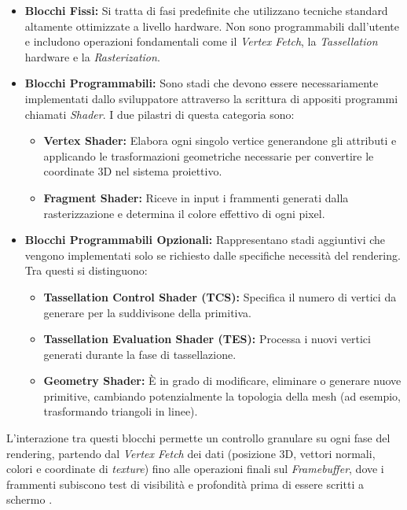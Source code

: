 \begin{itemize}
    \item \textbf{Blocchi Fissi:} Si tratta di fasi predefinite che utilizzano tecniche standard altamente ottimizzate a livello hardware. Non sono programmabili dall'utente e includono operazioni fondamentali come il \textit{Vertex Fetch}, la \textit{Tassellation} hardware e la \textit{Rasterization}.
    
    \item \textbf{Blocchi Programmabili:} Sono stadi che devono essere necessariamente implementati dallo sviluppatore attraverso la scrittura di appositi programmi chiamati \textit{Shader}. I due pilastri di questa categoria sono:
    \begin{itemize}
        \item \textbf{Vertex Shader:} Elabora ogni singolo vertice generandone gli attributi e applicando le trasformazioni geometriche necessarie per convertire le coordinate 3D nel sistema proiettivo.
        \item \textbf{Fragment Shader:} Riceve in input i frammenti generati dalla rasterizzazione e determina il colore effettivo di ogni pixel.
    \end{itemize}
    
    \item \textbf{Blocchi Programmabili Opzionali:} Rappresentano stadi aggiuntivi che vengono implementati solo se richiesto dalle specifiche necessità del rendering. Tra questi si distinguono:
    \begin{itemize}
        \item \textbf{Tassellation Control Shader (TCS):} Specifica il numero di vertici da generare per la suddivisone della primitiva.
        \item \textbf{Tassellation Evaluation Shader (TES):} Processa i nuovi vertici generati durante la fase di tassellazione.
        \item \textbf{Geometry Shader:} È in grado di modificare, eliminare o generare nuove primitive, cambiando potenzialmente la topologia della mesh (ad esempio, trasformando triangoli in linee).
    \end{itemize}
\end{itemize}

L'interazione tra questi blocchi permette un controllo granulare su ogni fase del rendering, partendo dal \textit{Vertex Fetch} dei dati (posizione 3D, vettori normali, colori e coordinate di \textit{texture}) fino alle operazioni finali sul \textit{Framebuffer}, dove i frammenti subiscono test di visibilità e profondità prima di essere scritti a schermo \cite{AkenineRealTimeRendering, HughesComputerGraphics}.
